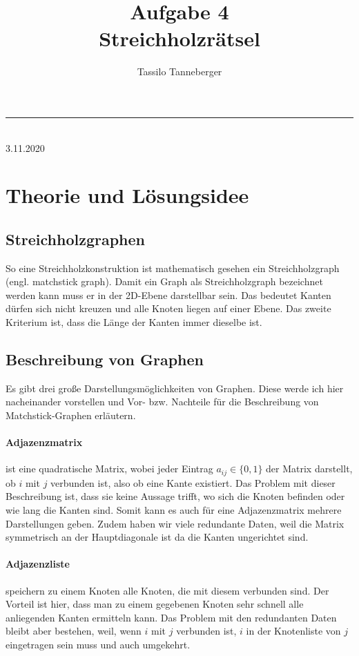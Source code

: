 \documentclass[12pt]{article}
\title{Aufgabe 4\\Streichholzrätsel}
\author{Tassilo Tanneberger}
\makeatletter
\newcommand{\linia}{\rule{\linewidth}{1pt}}
\renewcommand{\maketitle}{
\begin{center}
\huge \@title
\end{center}
\linia\\
{\large\@author\hfill 3.11.2020\\}}
\makeatother
\begin{document}
\maketitle

\section*{Theorie und Lösungsidee}
\subsection*{Streichholzgraphen}
So eine Streichholzkonstruktion ist mathematisch gesehen ein Streichholzgraph (engl. matchstick graph). Damit ein Graph als Streichholzgraph bezeichnet werden kann muss er in der 2D-Ebene darstellbar sein. Das bedeutet Kanten dürfen sich nicht kreuzen und alle Knoten liegen auf einer Ebene. Das zweite Kriterium ist, dass die Länge der Kanten immer dieselbe ist. 

\subsection*{Beschreibung von Graphen}
Es gibt drei große Darstellungsmöglichkeiten von Graphen. Diese werde ich hier nacheinander vorstellen und Vor- bzw. Nachteile für die Beschreibung von Matchstick-Graphen erläutern. \\

\paragraph{Adjazenzmatrix} 
ist eine quadratische Matrix, wobei jeder Eintrag $ a_{ij} \in \lbrace 0, 1 \rbrace $ der Matrix darstellt, ob $ i $ mit $ j $ verbunden ist, also ob eine Kante existiert. Das Problem mit dieser Beschreibung ist, dass sie keine Aussage trifft, wo sich die Knoten befinden oder wie lang die Kanten sind. Somit kann es auch für eine Adjazenzmatrix mehrere Darstellungen geben. Zudem haben wir viele redundante Daten, weil die Matrix symmetrisch an der Hauptdiagonale ist da die Kanten ungerichtet sind.

\paragraph{Adjazenzliste}
speichern zu einem Knoten alle Knoten, die mit diesem verbunden sind. Der Vorteil ist hier, dass man zu einem gegebenen Knoten sehr schnell alle anliegenden Kanten ermitteln kann. Das Problem mit den redundanten Daten bleibt aber bestehen, weil, wenn $ i $ mit $ j $ verbunden ist, $ i $ in der Knotenliste von $ j $ eingetragen sein muss und auch umgekehrt.
\end{document}
